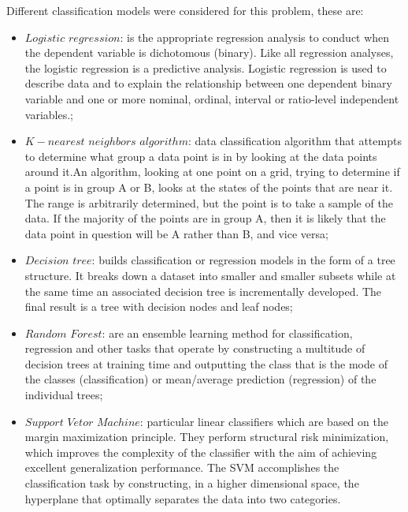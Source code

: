\documentclass[12pt,]{article}
\begin{document}
\quad Different classification models were considered for this problem,
these are:

\begin{itemize}
   \item $Logistic$ $regression$: is the appropriate regression analysis to conduct when the dependent variable is dichotomous (binary).  Like all regression analyses, the logistic regression is a predictive analysis.  Logistic regression is used to describe data and to explain the relationship between one dependent binary variable and one or more nominal, ordinal, interval or ratio-level independent variables.;
   
   \item $K-nearest$ $neighbors$ $algorithm$: data classification algorithm that attempts to determine what group a data point is in by looking at the data points around it.An algorithm, looking at one point on a grid, trying to determine if a point is in group A or B, looks at the states of the points that are near it. The range is arbitrarily determined, but the point is to take a sample of the data. If the majority of the points are in group A, then it is likely that the data point in question will be A rather than B, and vice versa;
   
   \item  $Decision$ $tree$: builds classification or regression models in the form of a tree structure. It breaks down a dataset into smaller and smaller subsets while at the same time an associated decision tree is incrementally developed. The final result is a tree with decision nodes and leaf nodes;
    \item  $Random$ $Forest$: are an ensemble learning method for classification, regression and other tasks that operate by constructing a multitude of decision trees at training time and outputting the class that is the mode of the classes (classification) or mean/average prediction (regression) of the individual trees;
    \item  $Support$ $Vetor$ $Machine$: particular linear classifiers which are based on the margin maximization principle. They perform structural risk minimization, which improves the complexity of the classifier with the aim of achieving excellent generalization performance. The SVM accomplishes the classification task by constructing, in a higher dimensional space, the hyperplane that optimally separates the data into two categories.
\end{itemize}
\end{document}
